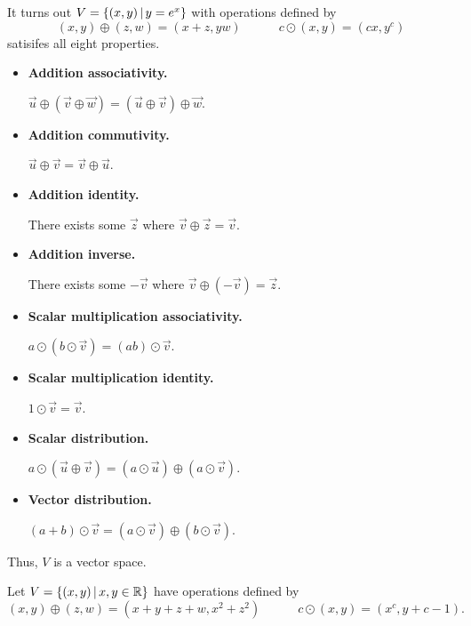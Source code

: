\begin{applicationActivities}
\begin{remark}
  It turns out \(V=\left\{(x,y)\,\middle|\,y=e^x\right\}\) with operations defined by
  \[
    (x,y)\oplus (z,w)=(x+z,yw)
      \hspace{3em}
    c\odot (x,y)=(cx,y^c)
  \]
  satisifes all eight properties.
    \begin{multicols}{2}
    \begin{itemize}
      \item \textbf{Addition associativity.}

            \(\vec u\oplus(\vec v\oplus\vec w)=
            (\vec u\oplus\vec v)\oplus\vec w\).
      \item \textbf{Addition commutivity.}

            \(\vec u\oplus\vec v=
            \vec v\oplus\vec u\).
      \item \textbf{Addition identity.}

            There exists some \(\vec z\)
            where \(\vec v\oplus\vec z=\vec v\).
      \item \textbf{Addition inverse.}

            There exists some \(-\vec v\)
            where \(\vec v\oplus(-\vec v)=\vec z\).
      \item \textbf{Scalar multiplication associativity.}

            \(a\odot(b\odot\vec v)=(ab)\odot\vec v\).
      \item \textbf{Scalar multiplication identity.}

            \(1\odot\vec v=\vec v\).
      \item \textbf{Scalar distribution.}

            \(a\odot(\vec u\oplus\vec v)=
            (a\odot\vec u)\oplus (a\odot\vec v)\).
      \item \textbf{Vector distribution.}

            \((a+b)\odot\vec v=(a\odot\vec v)\oplus (b\odot\vec v)\).
    \end{itemize}
    \end{multicols}
	Thus, \(V\) is a vector space.
\end{remark}





\begin{activity}{15}
  Let \(V=\left\{(x,y)\,\middle|\,x,y\in\mathbb{R}\right\}\) have operations defined by
  \[
    (x,y)\oplus (z,w)=(x+y+z+w,x^2+z^2)
      \hspace{3em}
    c\odot (x,y)=(x^c,y+c-1)
  .\]


\end{activity}
\end{applicationActivities}
